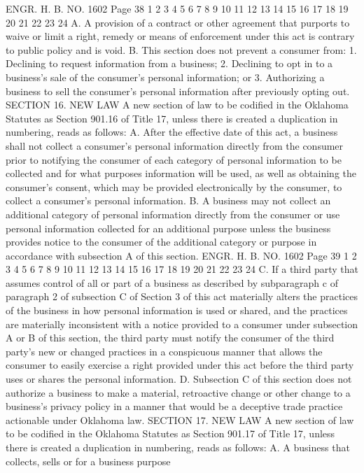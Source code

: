 ENGR. H. B. NO. 1602 Page 38
1
2
3
4
5
6
7
8
9
10
11
12
13
14
15
16
17
18
19
20
21
22
23
24
A. A provision of a contract or other agreement that purports
to waive or limit a right, remedy or means of enforcement under this
act is contrary to public policy and is void.
B. This section does not prevent a consumer from:
1. Declining to request information from a business;
2. Declining to opt in to a business's sale of the consumer's
personal information; or
3. Authorizing a business to sell the consumer's personal
information after previously opting out.
SECTION 16. NEW LAW A new section of law to be codified
in the Oklahoma Statutes as Section 901.16 of Title 17, unless there
is created a duplication in numbering, reads as follows:
A. After the effective date of this act, a business shall not
collect a consumer's personal information directly from the consumer
prior to notifying the consumer of each category of personal
information to be collected and for what purposes information will
be used, as well as obtaining the consumer's consent, which may be
provided electronically by the consumer, to collect a consumer's
personal information.
B. A business may not collect an additional category of
personal information directly from the consumer or use personal
information collected for an additional purpose unless the business
provides notice to the consumer of the additional category or
purpose in accordance with subsection A of this section.
ENGR. H. B. NO. 1602 Page 39
1
2
3
4
5
6
7
8
9
10
11
12
13
14
15
16
17
18
19
20
21
22
23
24
C. If a third party that assumes control of all or part of a
business as described by subparagraph c of paragraph 2 of subsection
C of Section 3 of this act materially alters the practices of the
business in how personal information is used or shared, and the
practices are materially inconsistent with a notice provided to a
consumer under subsection A or B of this section, the third party
must notify the consumer of the third party's new or changed
practices in a conspicuous manner that allows the consumer to easily
exercise a right provided under this act before the third party uses
or shares the personal information.
D. Subsection C of this section does not authorize a business
to make a material, retroactive change or other change to a
business's privacy policy in a manner that would be a deceptive
trade practice actionable under Oklahoma law.
SECTION 17. NEW LAW A new section of law to be codified
in the Oklahoma Statutes as Section 901.17 of Title 17, unless there
is created a duplication in numbering, reads as follows:
A. A business that collects, sells or for a business purpose
